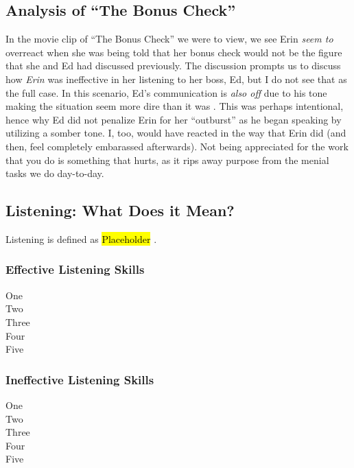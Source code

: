 \documentclass[stu,12pt]{apa7}
\begin{document}
    \newpage
    \subsection{Analysis of ``The Bonus Check''}
      In the movie clip of ``The Bonus Check'' we were to view, we see Erin
        \textit{seem to} overreact when she was being told that her bonus check
        would not be the figure that she and Ed had discussed previously. The
        discussion prompts us to discuss how \textit{Erin} was ineffective in
        her listening to her boss, Ed, but I do not see that as the full case.
        In this scenario, Ed's communication is \textit{also off} due to his
        tone making the situation seem more dire than it was
        \parencite{soderbergh_erin_2000}. This was perhaps intentional, hence
        why Ed did not penalize Erin for her ``outburst'' as he began speaking
        by utilizing a somber tone. I, too, would have reacted in the way that
        Erin did (and then, feel completely embarassed afterwards). Not being
        appreciated for the work that you do is something that hurts, as it rips
        away purpose from the menial tasks we do day-to-day.


    \subsection{Listening: What Does it Mean?}
      Listening is defined as \hl{Placeholder} \parencite{bodie_listening_2012}.

      \subsubsection{Effective Listening Skills}
          \begin{description}
            \item[One]
            \item[Two]
            \item[Three]
            \item[Four]
            \item[Five]
          \end{description}

      \subsubsection{Ineffective Listening Skills}
          \begin{description}
            \item[One]
            \item[Two]
            \item[Three]
            \item[Four]
            \item[Five]
          \end{description}
\end{document}
